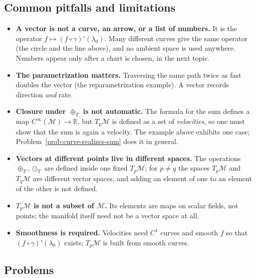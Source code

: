 \documentclass[11pt]{article}
\newcommand{\TpM}{T_p\mathcal M}
\newcommand{\Cinf}{C^\infty(\mathcal M)}
\begin{document}
\subsection*{Common pitfalls and limitations}

\begin{itemize}
  \item \textbf{A vector is not a curve, an arrow, or a list of numbers.} It is the operator $f\mapsto(f\circ\gamma)'(\lambda_0)$. Many different curves give the same operator (the circle and the line above), and no ambient space is used anywhere. Numbers appear only after a chart is chosen, in the next topic.
  \item \textbf{The parametrization matters.} Traversing the same path twice as fast doubles the vector (the reparametrization example). A vector records direction \emph{and} rate.
  \item \textbf{Closure under $\oplus_T$ is not automatic.} The formula for the sum defines a map $\Cinf\to\mathbb R$, but $\TpM$ is defined as a set of \emph{velocities}, so one must show that the sum is again a velocity. The example above exhibits one case; Problem~\ref{prob:curve-realizes-sum} does it in general.
  \item \textbf{Vectors at different points live in different spaces.} The operations $\oplus_T,\odot_T$ are defined inside one fixed $\TpM$; for $p\neq q$ the spaces $\TpM$ and $T_q\mathcal M$ are different vector spaces, and adding an element of one to an element of the other is not defined.
  \item \textbf{$T_p\mathcal M$ is not a subset of $\mathcal M$.} Its elements are maps on scalar fields, not points; the manifold itself need not be a vector space at all.
  \item \textbf{Smoothness is required.} Velocities need $C^1$ curves and smooth $f$ so that $(f\circ\gamma)'(\lambda_0)$ exists; $\TpM$ is built from smooth curves.
\end{itemize}

\subsection*{Problems}
\end{document}
